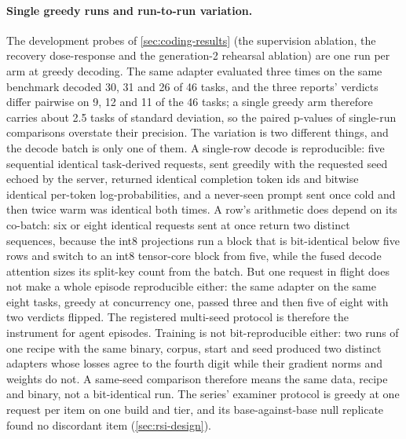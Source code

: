 \paragraph{Single greedy runs and run-to-run variation.} The development probes of \cref{sec:coding-results} (the supervision ablation, the recovery dose-response and the generation-2 rehearsal ablation) are one run per arm at greedy decoding. The same adapter evaluated three times on the same benchmark decoded 30, 31 and 26 of 46 tasks, and the three reports' verdicts differ pairwise on 9, 12 and 11 of the 46 tasks; a single greedy arm therefore carries about 2.5 tasks of standard deviation, so the paired p-values of single-run comparisons overstate their precision. The variation is two different things, and the decode batch is only one of them. A single-row decode is reproducible: five sequential identical task-derived requests, sent greedily with the requested seed echoed by the server, returned identical completion token ids and bitwise identical per-token log-probabilities, and a never-seen prompt sent once cold and then twice warm was identical both times. A row's arithmetic does depend on its co-batch: six or eight identical requests sent at once return two distinct sequences, because the int8 projections run a block that is bit-identical below five rows and switch to an int8 tensor-core block from five, while the fused decode attention sizes its split-key count from the batch. But one request in flight does not make a whole episode reproducible either: the same adapter on the same eight tasks, greedy at concurrency one, passed three and then five of eight with two verdicts flipped. The registered multi-seed protocol is therefore the instrument for agent episodes. Training is not bit-reproducible either: two runs of one recipe with the same binary, corpus, start and seed produced two distinct adapters whose losses agree to the fourth digit while their gradient norms and weights do not. A same-seed comparison therefore means the same data, recipe and binary, not a bit-identical run. The series' examiner protocol is greedy at one request per item on one build and tier, and its base-against-base null replicate found no discordant item (\cref{sec:rsi-design}).

